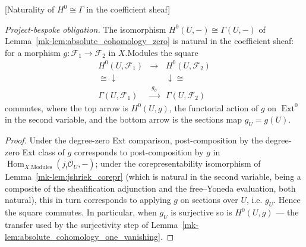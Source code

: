 \begin{lemma}

[Naturality of \(H^0 \cong \Gamma\) in the coefficient sheaf]
  \label{mk-lem:absolute_cohomology_zero_natural}

  \textit{Project-bespoke obligation.}
  The isomorphism \(H^0(U, -) \cong \Gamma(U, -)\) of Lemma~\ref{mk-lem:absolute_cohomology_zero} is
  natural in the coefficient sheaf: for a morphism \(g : \mathcal{F}_1 \to \mathcal{F}_2\) in
  \(X.\mathrm{Modules}\) the square
  \[
    \begin{array}{ccc}
      H^0(U, \mathcal{F}_1) & \longrightarrow & H^0(U, \mathcal{F}_2)\\
      \cong\downarrow & & \downarrow\cong\\
      \Gamma(U, \mathcal{F}_1) & \xrightarrow{\;g_U\;} & \Gamma(U, \mathcal{F}_2)
    \end{array}
  \]
  commutes, where the top arrow is \(H^0(U, g)\), the functorial action of \(g\) on
  \(\operatorname{Ext}^0\) in the second variable, and the bottom arrow is the sections map
  \(g_U = g(U)\).
\end{lemma}
\begin{proof}
  Under the degree-zero Ext comparison, post-composition by the degree-zero Ext class of \(g\)
  corresponds to post-composition by \(g\) in \(\operatorname{Hom}_{X.\mathrm{Modules}}(j_!
  \mathcal{O}_U, -)\); under the corepresentability isomorphism of Lemma~\ref{mk-lem:jshriek_corepr}
  (which is natural in the second variable, being a composite of the sheafification adjunction and
  the free–Yoneda evaluation, both natural), this in turn corresponds to applying \(g\) on sections
  over \(U\), i.e. \(g_U\). Hence the square commutes. In particular, when \(g_U\) is surjective so
  is \(H^0(U, g)\) — the transfer used by the surjectivity step of
  Lemma~\ref{mk-lem:absolute_cohomology_one_vanishing}.
\end{proof}

